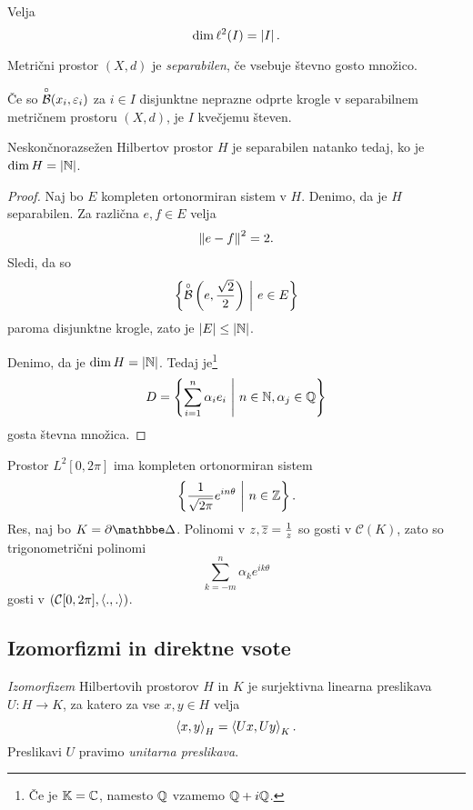 \begin{zgled}
Velja
\[
\dim \ell^2(I) = \left\lvert I\right\rvert.
\]
\end{zgled}

\begin{definicija}
Metrični prostor $(X, d)$ je
\emph{separabilen}, če vsebuje
števno gosto množico.
\end{definicija}

\begin{lema}
Če so $\overset{\circ}{\mathcal{B}}(x_i, \varepsilon_i)$ za $i \in I$ disjunktne neprazne
odprte krogle v separabilnem metričnem prostoru $(X, d)$, je $I$
kvečjemu števen.
\end{lema}

\obvs

\begin{trditev}
Neskončnorazsežen Hilbertov prostor $H$ je separabilen natanko
tedaj, ko je $\dim H = \left\lvert \mathbb{N}\right\rvert$.
\end{trditev}

\begin{proof}
Naj bo $E$ kompleten ortonormiran sistem v $H$. Denimo, da je $H$
separabilen. Za različna $e, f \in E$ velja
\[
\left\lVert e-f\right\rVert^2 = 2.
\]
Sledi, da so
\[
\left\{\overset{\circ}{\mathcal{B}}\left(e, \frac{\sqrt{2}}{2}\right)~\middle\vert~e \in E\right\}
\]
paroma disjunktne krogle, zato je $\left\lvert E\right\rvert \leq \left\lvert \mathbb{N}\right\rvert$.

Denimo, da je $\dim H = \left\lvert \mathbb{N}\right\rvert$. Tedaj je\footnote{Če je
$\mathbb{K} = \mathbb{C}$, namesto $\mathbb{Q}$ vzamemo $\mathbb{Q} + i\mathbb{Q}$.}
\[
D = \left\{\sum_{i=1}^n \alpha_i e_i~\middle\vert~n \in \mathbb{N}, \alpha_j \in \mathbb{Q}\right\}
\]
gosta števna množica.
\end{proof}

\begin{zgled}
Prostor $L^2[0, 2\pi]$ ima kompleten ortonormiran sistem
\[
\left\{\frac{1}{\sqrt{2 \pi}} e^{in \theta}~\middle\vert~n \in \mathbb{Z}\right\}.
\]
Res, naj bo $K = \partial \dsk$. Polinomi v
$z, \overline{z} = \frac{1}{z}$ so gosti v $\mathcal{C}(K)$, zato so
trigonometrični polinomi
\[
\sum_{k=-m}^n \alpha_k e^{ik \theta}
\]
gosti v $(\mathcal{C}[0, 2\pi], \left\langle .,.\right\rangle)$.
\end{zgled}

\newpage

\subsection{Izomorfizmi in direktne vsote}

\begin{definicija}
\emph{Izomorfizem}
Hilbertovih prostorov $H$ in $K$ je surjektivna linearna preslikava
$U \colon H \to K$, za katero za vse $x, y \in H$ velja
\[
\left\langle x,y\right\rangle_H = \left\langle Ux, Uy\right\rangle_K.
\]
Preslikavi $U$ pravimo
\emph{unitarna preslikava}.
\end{definicija}

